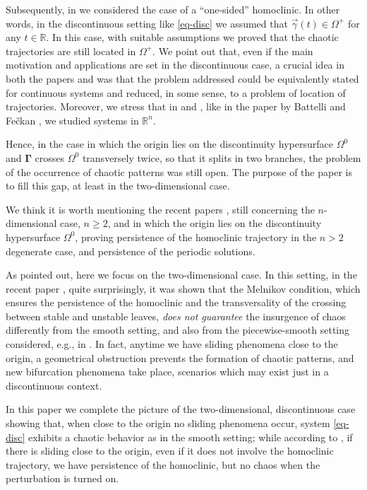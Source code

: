 \documentclass[10pt]{article}
\numberwithin{equation}{section}
\def\ga{\vec{\gamma}}
\def\Om{\Omega}
\def\R{{\mathbb R}}
\newcommand\bs[1]{{\boldsymbol{#1}}}
\theoremstyle{definition}
\theoremstyle{remark}
\begin{document}
Subsequently, in \cite{CDFP} we considered the case of a ``one-sided'' homoclinic.
In other words, in the discontinuous setting like \eqref{eq-disc} we assumed that
${\ga}(t)\in \Omega^+$ for any $t \in \R$.
In this case, with suitable assumptions we proved that the chaotic trajectories are still located in  $\Omega^+$.
 We point out that, even if the main motivation and applications are set in the discontinuous case,
a crucial idea in both the papers \cite{CaFr} and \cite{CDFP}  was that the problem addressed   could be
equivalently stated for continuous systems and reduced, in some sense, to a problem of location of trajectories.
Moreover, we stress that in \cite{CaFr} and \cite{CDFP}, like in the paper by Battelli and Fe\v ckan \cite{BF11}, we studied systems in
$\R^n$.

Hence, in the case in which the   origin lies on the discontinuity hypersurface $\Om^0$ and $\bs{\Gamma}$ crosses
$\Om^0$ transversely
 twice, so that it
 splits in two branches,  the problem of the occurrence of chaotic patterns was still open.
 The purpose of the paper is to fill this gap, at least in the two-dimensional case.

We think it is worth mentioning the recent papers \cite{HL24, HuLi}, still concerning the $n$-dimensional case,
$n \ge 2$, and in which
the origin lies on the discontinuity hypersurface $\Om^0$, proving persistence of the homoclinic trajectory
in the $n>2$ degenerate case, and persistence of the periodic solutions.


As pointed out, here we focus on the two-dimensional case. In this setting, in the recent paper \cite{FrPo},
quite surprisingly,
it was shown
that the Melnikov condition,
which ensures the persistence of the homoclinic \cite{CaFr} and the transversality of
the crossing between stable and unstable leaves, \emph{does not guarantee} the insurgence of chaos
differently from the smooth setting, and also from the piecewise-smooth setting considered, e.g., in \cite{K2,KRG,LPT,BF08,BF10, BF11}.
In fact, anytime we have sliding phenomena
 close to the origin, a geometrical obstruction prevents the formation of chaotic patterns, and new bifurcation
 phenomena take place, scenarios which may exist just in a discontinuous context.


 In this paper we complete the picture
 of the two-dimensional, discontinuous case showing
 that, when close to the origin no sliding phenomena occur,
  system \eqref{eq-disc} exhibits a chaotic behavior
as in the smooth setting; while according to \cite{CaFr}, if there is sliding close to the origin, even if
 it does not involve the homoclinic trajectory, we have persistence of the homoclinic, but no chaos when the perturbation is turned on.
\end{document}
